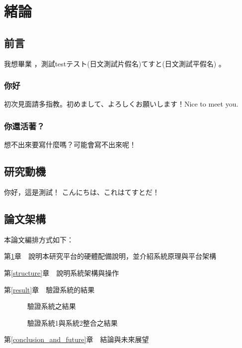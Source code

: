 \chapter{緒論}\label{explanation}


\section{前言}\label{1-1}
我想畢業 \cite{m1}，測試testテスト(日文測試片假名)てすと(日文測試平假名)\cite{talbot97} 。

\subsection{你好}
初次見面請多指教。初めまして、よろしくお願いします！Nice to meet you.

\subsection{你還活著？}
想不出來要寫什麼嗎？可能會寫不出來呢！\cite{goossens97}

\newpage

\section{研究動機}\label{1-2}
你好，這是測試！
こんにちは、これはてすとだ！

\newpage

\section{論文架構}\label{1-3}

\n 本論文編排方式如下：

第\ref{explanation}章　說明本研究平台的硬體配備說明，並介紹系統原理與平台架構

第\ref{structure}章　說明系統架構與操作

第\ref{result}章　驗證系統的結果
		
　　　      驗證系統之結果

　　　      驗證系統1與系統2整合之結果

第\ref{conclusion_and_future}章　結論與未來展望
